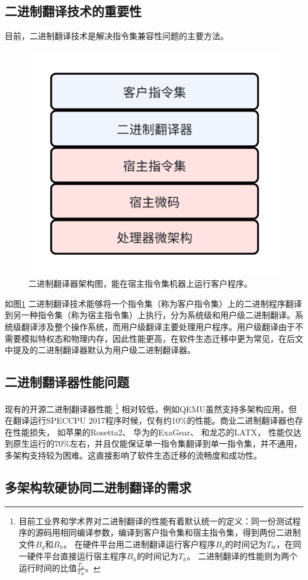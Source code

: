 \documentclass{Style/ucasproposal}%
\begin{document}
\subsection{二进制翻译技术的重要性}
目前，二进制翻译技术是解决指令集兼容性问题的主要方法。

\begin{figure}[h]
    \centering
    \includegraphics[width=0.3\linewidth]{./feishuImage/BT_arch.png}
    \caption{二进制翻译器架构图，能在宿主指令集机器上运行客户程序。}
    \label{img:BT_arch}
  \end{figure}

如图\ref{img:BT_arch} 二进制翻译技术能够将一个指令集（称为客户指令集）上的二进制程序翻译到另一种指令集（称为宿主指令集）上执行，分为系统级和用户级二进制翻译。系统级翻译涉及整个操作系统，而用户级翻译主要处理用户程序。用户级翻译由于不需要模拟特权态和物理内存，因此性能更高，在软件生态迁移中更为常见，在后文中提及的二进制翻译器默认为用户级二进制翻译器。

\subsection{二进制翻译器性能问题}
现有的开源二进制翻译器性能
\footnote{
    目前工业界和学术界对二进制翻译的性能有着默认统一的定义：同一份测试程序的源码用相同编译参数，编译到客户指令集和宿主指令集，得到两份二进制文件$B_g$和$B_h$。
    在硬件平台用二进制翻译运行客户程序$B_g$的时间记为$T_{bt}$，在同一硬件平台直接运行宿主程序$B_h$的时间记为$T_h$。
    二进制翻译的性能则为两个运行时间的比值$\frac{T_h}{T_{bt}}$。
}
相对较低，例如QEMU\cite{bellardQEMUFastPortable2005}虽然支持多架构应用，但在翻译运行SPECCPU 2017\cite{SPECCPU2017}程序时候，仅有约10\%的性能。商业二进制翻译器也存在性能损失，
如苹果的Rosetta2\cite{RosettaTranslationEnvironment, RunningIntelBinaries}、
华为的ExaGear\cite{KunPengExaGear}、
和龙芯的LATX\cite{LoongArchEnv2022, LoongArch2023}，
性能仅达到原生运行的70\%左右，并且仅能保证单一指令集翻译到单一指令集，并不通用，多架构支持较为困难。这直接影响了软件生态迁移的流畅度和成功性。

\subsection{多架构软硬协同二进制翻译的需求}
\end{document}
